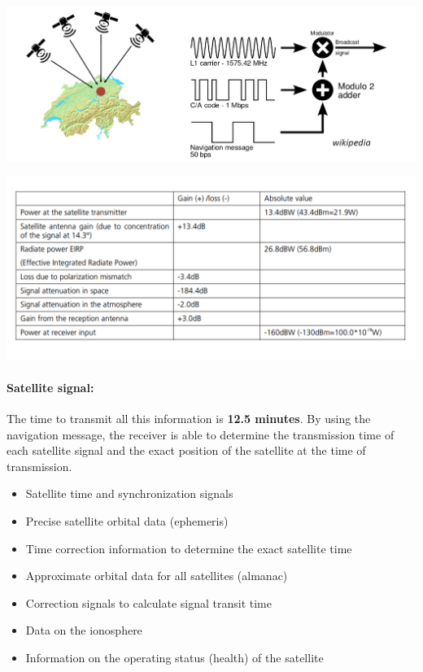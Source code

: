 \begin{minipage}{\linewidth}
    \centering      
    \includegraphics[width=\linewidth]{Figures/L4_gps.PNG} 
\end{minipage}
\begin{minipage}{\linewidth}
    \centering      
    \includegraphics[width=\linewidth]{Figures/L4_power.PNG} 
\end{minipage}

\paragraph{Satellite signal:} The time to transmit all this information is \textbf{12.5 minutes}. By using the navigation message, the receiver is able to determine the transmission time of each satellite signal and the exact position of the satellite at the time of transmission.
\begin{itemize}
    \item Satellite time and synchronization signals
    \item Precise satellite orbital data (ephemeris)
    \item Time correction information to determine the exact satellite time
    \item Approximate orbital data for all satellites (almanac)
    \item Correction signals to calculate signal transit time
    \item Data on the ionosphere
    \item Information on the operating status (health) of the satellite
\end{itemize}

